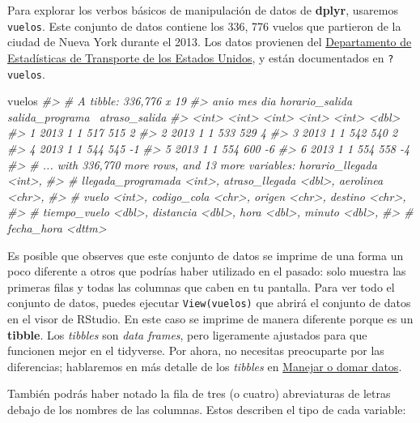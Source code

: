 \documentclass[11pt,oneside]{report}
\newenvironment{Shaded}{\begin{snugshade}}{\end{snugshade}}
\newcommand{\CommentTok}[1]{\textcolor[rgb]{0.56,0.35,0.01}{\textit{#1}}}
\newcommand{\NormalTok}[1]{#1}
\begin{document}
Para explorar los verbos básicos de manipulación de datos de
\textbf{dplyr}, usaremos \texttt{vuelos}. Este conjunto de datos
contiene los 336, 776 vuelos que partieron de la ciudad de Nueva York
durante el 2013. Los datos provienen del
\href{https://www.transtats.bts.gov/DatabaseInfo.asp?DB_ID=120\&Link=0}{Departamento
de Estadísticas de Transporte de los Estados Unidos}, y están
documentados en \texttt{?vuelos}.

\begin{Shaded}
\begin{Highlighting}[]
\NormalTok{vuelos}
\CommentTok{#> # A tibble: 336,776 x 19}
\CommentTok{#>    anio   mes   dia horario_salida salida_programa~ atraso_salida}
\CommentTok{#>   <int> <int> <int>          <int>            <int>         <dbl>}
\CommentTok{#> 1  2013     1     1            517              515             2}
\CommentTok{#> 2  2013     1     1            533              529             4}
\CommentTok{#> 3  2013     1     1            542              540             2}
\CommentTok{#> 4  2013     1     1            544              545            -1}
\CommentTok{#> 5  2013     1     1            554              600            -6}
\CommentTok{#> 6  2013     1     1            554              558            -4}
\CommentTok{#> # ... with 336,770 more rows, and 13 more variables: horario_llegada <int>,}
\CommentTok{#> #   llegada_programada <int>, atraso_llegada <dbl>, aerolinea <chr>,}
\CommentTok{#> #   vuelo <int>, codigo_cola <chr>, origen <chr>, destino <chr>,}
\CommentTok{#> #   tiempo_vuelo <dbl>, distancia <dbl>, hora <dbl>, minuto <dbl>,}
\CommentTok{#> #   fecha_hora <dttm>}
\end{Highlighting}
\end{Shaded}

Es posible que observes que este conjunto de datos se imprime de una
forma un poco diferente a otros que podrías haber utilizado en el
pasado: solo muestra las primeras filas y todas las columnas que caben
en tu pantalla. Para ver todo el conjunto de datos, puedes ejecutar
\texttt{View(vuelos)} que abrirá el conjunto de datos en el visor de
RStudio. En este caso se imprime de manera diferente porque es un
\textbf{tibble}. Los \emph{tibbles} son \emph{data frames}, pero
ligeramente ajustados para que funcionen mejor en el tidyverse. Por
ahora, no necesitas preocuparte por las diferencias; hablaremos en más
detalle de los \emph{tibbles} en
\protect\hyperlink{wrangle-intro}{Manejar o domar datos}.

También podrás haber notado la fila de tres (o cuatro) abreviaturas de
letras debajo de los nombres de las columnas. Estos describen el tipo de
cada variable:
\end{document}
